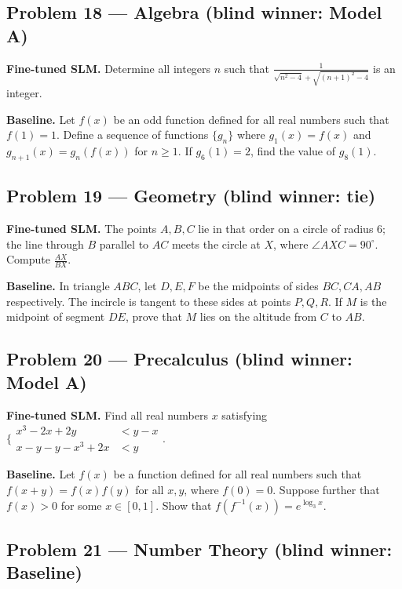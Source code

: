 \documentclass[11pt]{article}
\begin{document}
\subsection*{Problem 18 --- Algebra \quad (blind winner: Model A)}

\textbf{Fine-tuned SLM.} Determine all integers $n$ such that $\tfrac{1}{\sqrt{n^{2}-4}+\sqrt{(n+1)^{2}-4}}$ is an integer.

\medskip

\textbf{Baseline.} Let $f(x)$ be an odd function defined for all real numbers such that $f(1)=1$. Define a sequence of functions $\{g_n\}$ where $g_1(x) = f(x)$ and $g_{n+1}(x) = g_n(f(x))$ for $n \geq 1$. If $g_6(1)=2$, find the value of $g_8(1)$.

\subsection*{Problem 19 --- Geometry \quad (blind winner: tie)}

\textbf{Fine-tuned SLM.} The points $A, B, C$ lie in that order on a circle of radius 6; the line through $B$ parallel to $AC$ meets the circle at $X$, where $\angle AXC = 90^\circ$. Compute $\frac{AX}{BX}$.

\medskip

\textbf{Baseline.} In triangle $ABC$, let $D, E, F$ be the midpoints of sides $BC, CA, AB$ respectively. The incircle is tangent to these sides at points $P, Q, R$. If $M$ is the midpoint of segment $DE$, prove that $M$ lies on the altitude from $C$ to $AB$.

\subsection*{Problem 20 --- Precalculus \quad (blind winner: Model A)}

\textbf{Fine-tuned SLM.} Find all real numbers $x$ satisfying $\{\begin{aligned} x^{3}-2 x+2 y & <y-x \\ x-y-y-x^{3}+2 x & <y \end{aligned}.$

\medskip

\textbf{Baseline.} Let $f(x)$ be a function defined for all real numbers such that $f(x + y) = f(x)f(y)$ for all $x, y$, where $f(0) = 0$. Suppose further that $f(x) > 0$ for some $x \in [0, 1]$. Show that $f(f^{-1}(x)) = e^{\log_3{x}}$.

\subsection*{Problem 21 --- Number Theory \quad (blind winner: Baseline)}
\end{document}
